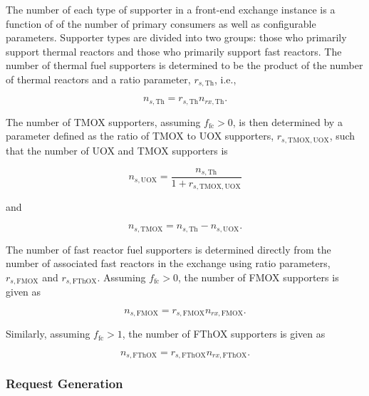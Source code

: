 The number of each type of supporter in a front-end exchange instance is a
function of of the number of primary consumers as well as configurable
parameters. Supporter types are divided into two groups: those who primarily
support thermal reactors and those who primarily support fast reactors. The
number of thermal fuel supporters is determined to be the product of the number
of thermal reactors and a ratio parameter, $r_{s, \text{Th}}$, i.e.,

\begin{equation}
n_{s, \text{Th}} = r_{s, \text{Th}} n_{rx, \text{Th}}.
\end{equation}

The number of TMOX supporters, assuming $f_{\text{fc}} > 0$, is then determined
by a parameter defined as the ratio of TMOX to UOX supporters, $r_{s,
  \text{TMOX}, \text{UOX}}$, such that the number of UOX and TMOX supporters is

\begin{equation}
n_{s, \text{UOX}} = \frac{n_{s, \text{Th}}}{1 + r_{s, \text{TMOX}, \text{UOX}}}
\end{equation}

\noindent
and

\begin{equation}
n_{s, \text{TMOX}} = n_{s, \text{Th}} - n_{s, \text{UOX}}.
\end{equation}

The number of fast reactor fuel supporters is determined directly from the number
of associated fast reactors in the exchange using ratio parameters,
$r_{s, \text{FMOX}}$ and $r_{s, \text{FThOX}}$. Assuming $f_{\text{fc}} > 0$, the number of FMOX
supporters is given as

\begin{equation}
n_{s, \text{FMOX}} = r_{s, \text{FMOX}} n_{rx, \text{FMOX}}.
\end{equation}

\noindent
Similarly, assuming $f_{\text{fc}} > 1$, the number of FThOX supporters is given as  

\begin{equation}
n_{s, \text{FThOX}} = r_{s, \text{FThOX}} n_{rx, \text{FThOX}}.
\end{equation}

\subsubsection{Request Generation}\label{method:setup:front:reqgen}


